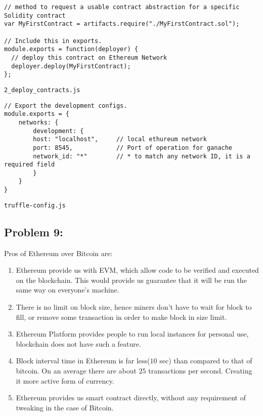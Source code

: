 \documentclass[a4paper]{article}
\begin{document}
\begin{lstlisting}[style=C++]
// method to request a usable contract abstraction for a specific Solidity contract
var MyFirstContract = artifacts.require("./MyFirstContract.sol");

// Include this in exports.
module.exports = function(deployer) {
  // deploy this contract on Ethereum Network
  deployer.deploy(MyFirstContract);
};
\end{lstlisting}
\texttt{2\_deploy\_contracts.js} \\


\begin{lstlisting}[style=C++]
// Export the development configs.
module.exports = {
    networks: {
        development: {
        host: "localhost",     // local ethureum network
        port: 8545,            // Port of operation for ganache
        network_id: "*"        // * to match any network ID, it is a required field
        }
    }
}
\end{lstlisting}
\texttt{truffle-config.js} \\

\subsection*{Problem 9:}

Pros of Ethereum over Bitcoin are:
\begin{enumerate}
    \item Ethereum provide us with EVM, which allow code to be verified and executed on the blockchain. This would
          provide us guarantee that it will be run the same way on everyone's machine.
    \item There is no limit on block size, hence miners don't have to wait for block to fill, or
          remove some transaction in order to make block in size limit.
    \item Ethereum Platform provides people to run local instances for personal use, blockchain does
          not have such a feature.
    \item Block interval time in Ethereum is far less($10$ sec) than compared to that of bitcoin. On an
          average there are about $25$ transactions per second. Creating it more active form of currency.
    \item Ethereum provides us smart contract directly, without any requirement of tweaking in the case of
          Bitcoin.
\end{enumerate}
\end{document}
